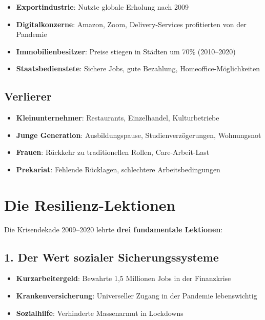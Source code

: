 \begin{itemize}
    \item \textbf{Exportindustrie}: Nutzte globale Erholung nach 2009
    \item \textbf{Digitalkonzerne}: Amazon, Zoom, Delivery-Services profitierten von der Pandemie
    \item \textbf{Immobilienbesitzer}: Preise stiegen in Städten um 70\% (2010–2020)
    \item \textbf{Staatsbedienstete}: Sichere Jobs, gute Bezahlung, Homeoffice-Möglichkeiten
\end{itemize}

\subsection{Verlierer}

\begin{itemize}
    \item \textbf{Kleinunternehmer}: Restaurants, Einzelhandel, Kulturbetriebe
    \item \textbf{Junge Generation}: Ausbildungspause, Studienverzögerungen, Wohnungsnot
    \item \textbf{Frauen}: Rückkehr zu traditionellen Rollen, Care-Arbeit-Last
    \item \textbf{Prekariat}: Fehlende Rücklagen, schlechtere Arbeitsbedingungen
\end{itemize}

\section{Die Resilienz-Lektionen}

Die Krisendekade 2009–2020 lehrte \textbf{drei fundamentale Lektionen}:

\subsection{1. Der Wert sozialer Sicherungssysteme}

\begin{itemize}
    \item \textbf{Kurzarbeitergeld}: Bewahrte 1,5 Millionen Jobs in der Finanzkrise
    \item \textbf{Krankenversicherung}: Universeller Zugang in der Pandemie lebenswichtig
    \item \textbf{Sozialhilfe}: Verhinderte Massenarmut in Lockdowns
\end{itemize}

